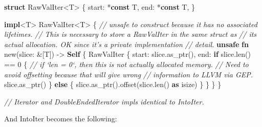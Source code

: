 \documentclass[a4paper,]{book}
\newenvironment{Shaded}{\begin{snugshade}}{\end{snugshade}}
\newcommand{\KeywordTok}[1]{\textcolor[rgb]{0.13,0.29,0.53}{\textbf{{#1}}}}
\newcommand{\DataTypeTok}[1]{\textcolor[rgb]{0.13,0.29,0.53}{{#1}}}
\newcommand{\DecValTok}[1]{\textcolor[rgb]{0.00,0.00,0.81}{{#1}}}
\newcommand{\CommentTok}[1]{\textcolor[rgb]{0.56,0.35,0.01}{\textit{{#1}}}}
\newcommand{\NormalTok}[1]{{#1}}
\begin{document}
\begin{Shaded}
\begin{Highlighting}[]
\KeywordTok{struct} \NormalTok{RawValIter<T> \{}
    \NormalTok{start: *}\KeywordTok{const} \NormalTok{T,}
    \NormalTok{end: *}\KeywordTok{const} \NormalTok{T,}
\NormalTok{\}}

\KeywordTok{impl}\NormalTok{<T> RawValIter<T> \{}
    \CommentTok{// unsafe to construct because it has no associated lifetimes.}
    \CommentTok{// This is necessary to store a RawValIter in the same struct as}
    \CommentTok{// its actual allocation. OK since it's a private implementation}
    \CommentTok{// detail.}
    \KeywordTok{unsafe} \KeywordTok{fn} \NormalTok{new(slice: &[T]) -> }\KeywordTok{Self} \NormalTok{\{}
        \NormalTok{RawValIter \{}
            \NormalTok{start: slice.as_ptr(),}
            \NormalTok{end: }\KeywordTok{if} \NormalTok{slice.len() == }\DecValTok{0} \NormalTok{\{}
                \CommentTok{// if `len = 0`, then this is not actually allocated memory.}
                \CommentTok{// Need to avoid offsetting because that will give wrong}
                \CommentTok{// information to LLVM via GEP.}
                \NormalTok{slice.as_ptr()}
            \NormalTok{\} }\KeywordTok{else} \NormalTok{\{}
                \NormalTok{slice.as_ptr().offset(slice.len() }\KeywordTok{as} \DataTypeTok{isize}\NormalTok{)}
            \NormalTok{\}}
        \NormalTok{\}}
    \NormalTok{\}}
\NormalTok{\}}

\CommentTok{// Iterator and DoubleEndedIterator impls identical to IntoIter.}
\end{Highlighting}
\end{Shaded}

And IntoIter becomes the following:
\end{document}
